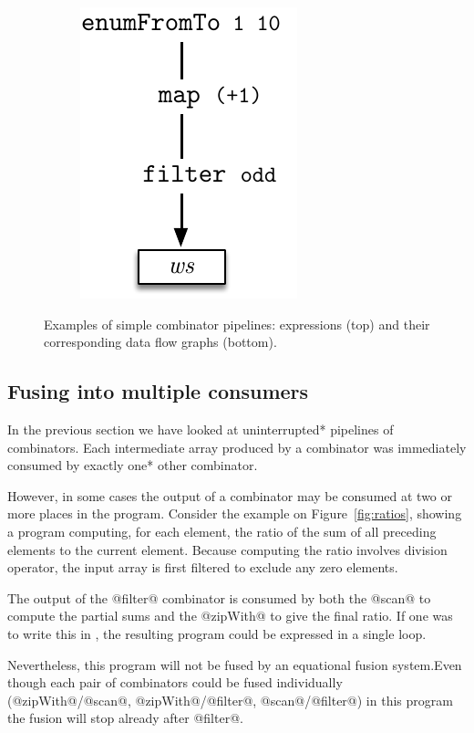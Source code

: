 \documentclass[preamble.tex]{subfiles}
\begin{document}
\begin{figure}
\begin{subfigure}{.33\textwidth}
\includegraphics[center,scale=0.85]{img/simple-pipeline-c}%
\end{subfigure}%

\caption{Examples of simple combinator pipelines: \Haskell expressions (top) and their corresponding data flow graphs (bottom).}
\label{fig:simple-piplines}
\end{figure}


\subsection{Fusing into multiple consumers}
\label{sec:multiple-consumers}

In the previous section we have looked at \*uninterrupted* pipelines of combinators. Each intermediate array produced by a combinator was immediately consumed by \*exactly one* other combinator.

However, in some cases the output of a combinator may be consumed at two or more places in the program. Consider the example on Figure~\ref{fig:ratios}, showing a program computing, for each element, the ratio of the sum of all preceding elements to the current element. Because computing the ratio involves division operator, the input array is first filtered to exclude any zero elements.

The output of the @filter@ combinator is consumed by both the @scan@ to compute the partial sums and the @zipWith@ to give the final ratio. If one was to write this in \C, the resulting program could be expressed in a single loop.

Nevertheless, this program will not be fused by an equational fusion system.\ieqf Even though each pair of combinators could be fused individually (@zipWith@/@scan@, @zipWith@/@filter@, @scan@/@filter@) in this program the fusion will stop already after @filter@.
\end{document}
